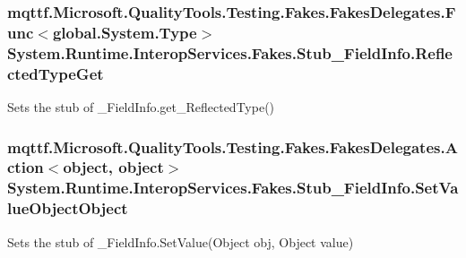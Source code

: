 \hypertarget{class_system_1_1_runtime_1_1_interop_services_1_1_fakes_1_1_stub___field_info_a7fbb080abf1cc8588e051e6ed531e4a0}{
\subsubsection[{Reflected\-Type\-Get}]{\setlength{\rightskip}{0pt plus 5cm}mqttf.\-Microsoft.\-Quality\-Tools.\-Testing.\-Fakes.\-Fakes\-Delegates.\-Func$<$global.\-System.\-Type$>$ System.\-Runtime.\-Interop\-Services.\-Fakes.\-Stub\-\_\-\-Field\-Info.\-Reflected\-Type\-Get}}\label{class_system_1_1_runtime_1_1_interop_services_1_1_fakes_1_1_stub___field_info_a7fbb080abf1cc8588e051e6ed531e4a0}


Sets the stub of \-\_\-\-Field\-Info.\-get\-\_\-\-Reflected\-Type()

\hypertarget{class_system_1_1_runtime_1_1_interop_services_1_1_fakes_1_1_stub___field_info_af107a455f7ebda7babc6c141e919b897}{
\subsubsection[{Set\-Value\-Object\-Object}]{\setlength{\rightskip}{0pt plus 5cm}mqttf.\-Microsoft.\-Quality\-Tools.\-Testing.\-Fakes.\-Fakes\-Delegates.\-Action$<$object, object$>$ System.\-Runtime.\-Interop\-Services.\-Fakes.\-Stub\-\_\-\-Field\-Info.\-Set\-Value\-Object\-Object}}\label{class_system_1_1_runtime_1_1_interop_services_1_1_fakes_1_1_stub___field_info_af107a455f7ebda7babc6c141e919b897}


Sets the stub of \-\_\-\-Field\-Info.\-Set\-Value(\-Object obj, Object value)

